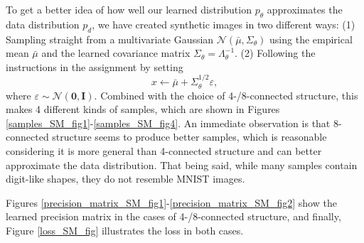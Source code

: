 \documentclass[a4paper]{article}
\theoremstyle{definition}
\theoremstyle{plain}
\begin{document}
To get a better idea of how well our learned distribution $p_\theta$ approximates the data distribution $p_d$, we have created synthetic images in two different ways: (1) Sampling straight from a multivariate Gaussian $\mathcal{N}(\bar\mu,\Sigma_\theta)$ using the empirical mean $\bar\mu$ and the learned covariance matrix $\Sigma_\theta = \Lambda_\theta^{-1}$. (2) Following the instructions in the assignment by setting
$$x \leftarrow \bar\mu + \Sigma_\theta^{1/2}\varepsilon,$$
where $\varepsilon \sim \mathcal{N}(\mathbf{0},\mathbf{I})$. Combined with the choice of 4-/8-connected structure, this makes 4 different kinds of samples, which are shown in Figures \ref{samples_SM_fig1}-\ref{samples_SM_fig4}. An immediate observation is that 8-connected structure seems to produce better samples, which is reasonable considering it is more general than 4-connected structure and can better approximate the data distribution. That being said, while many samples contain digit-like shapes, they do not resemble  MNIST images.

Figures \ref{precision_matrix_SM_fig1}-\ref{precision_matrix_SM_fig2} show the learned precision matrix in the cases of 4-/8-connected structure, and finally, Figure \ref{loss_SM_fig} illustrates the loss in both cases.
\end{document}
